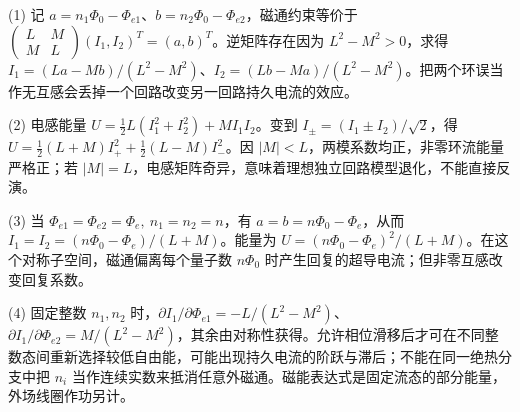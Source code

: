 (1) 记 \(a=n_1\Phi_0-\Phi_{e1}\)、\(b=n_2\Phi_0-\Phi_{e2}\)，磁通约束等价于 \(\begin{pmatrix}L&M\\M&L\end{pmatrix}(I_1,I_2)^T=(a,b)^T\)。逆矩阵存在因为 \(L^2-M^2>0\)，求得 \(I_1=(La-Mb)/(L^2-M^2)\)、\(I_2=(Lb-Ma)/(L^2-M^2)\)。把两个环误当作无互感会丢掉一个回路改变另一回路持久电流的效应。

(2) 电感能量 \(U=\tfrac12 L(I_1^2+I_2^2)+MI_1I_2\)。变到 \(I_\pm=(I_1\pm I_2)/\sqrt2\)，得 \(U=\tfrac12(L+M)I_+^2+\tfrac12(L-M)I_-^2\)。因 \(|M|<L\)，两模系数均正，非零环流能量严格正；若 \(|M|=L\)，电感矩阵奇异，意味着理想独立回路模型退化，不能直接反演。

(3) 当 \(\Phi_{e1}=\Phi_{e2}=\Phi_e,\ n_1=n_2=n\)，有 \(a=b=n\Phi_0-\Phi_e\)，从而 \(I_1=I_2=(n\Phi_0-\Phi_e)/(L+M)\)。能量为 \(U=(n\Phi_0-\Phi_e)^2/(L+M)\)。在这个对称子空间，磁通偏离每个量子数 \(n\Phi_0\) 时产生回复的超导电流；但非零互感改变回复系数。

(4) 固定整数 \(n_1,n_2\) 时，\(\partial I_1/\partial\Phi_{e1}=-L/(L^2-M^2)\)、\(\partial I_1/\partial\Phi_{e2}=M/(L^2-M^2)\)，其余由对称性获得。允许相位滑移后才可在不同整数态间重新选择较低自由能，可能出现持久电流的阶跃与滞后；不能在同一绝热分支中把 \(n_i\) 当作连续实数来抵消任意外磁通。磁能表达式是固定流态的部分能量，外场线圈作功另计。
